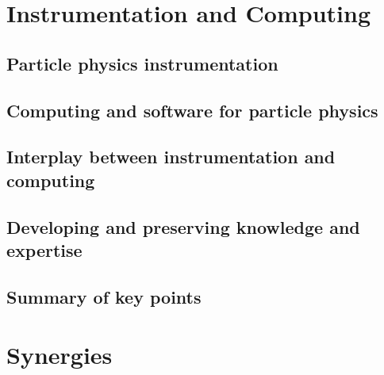 \documentclass[../report.tex]{subfiles}
\begin{document}
\chapter{Instrumentation and Computing}
\section{Particle physics instrumentation}
\section{Computing and software for particle physics}
\section{Interplay between instrumentation and computing}
\section{Developing and preserving knowledge and expertise}
\section{Summary of key points}

\chapter{Synergies}
\end{document}
